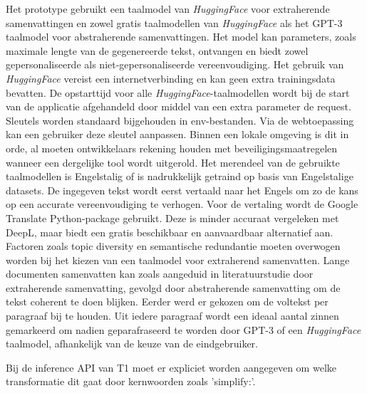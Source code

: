Het prototype gebruikt een taalmodel van \textit{HuggingFace} voor extraherende samenvattingen en zowel gratis taalmodellen van \textit{HuggingFace} als het GPT-3 taalmodel voor abstraherende samenvattingen. Het model kan parameters, zoals maximale lengte van de gegenereerde tekst, ontvangen en biedt zowel gepersonaliseerde als niet-gepersonaliseerde vereenvoudiging. Het gebruik van \textit{HuggingFace} vereist een internetverbinding en kan geen extra trainingsdata bevatten. De opstarttijd voor alle \textit{HuggingFace}-taalmodellen wordt bij de start van de applicatie afgehandeld door middel van een extra parameter de request. Sleutels worden standaard bijgehouden in env-bestanden. Via de webtoepassing kan een gebruiker deze sleutel aanpassen. Binnen een lokale omgeving is dit in orde, al moeten ontwikkelaars rekening houden met beveiligingsmaatregelen wanneer een dergelijke tool wordt uitgerold. Het merendeel van de gebruikte taalmodellen is Engelstalig of is nadrukkelijk getraind op basis van Engelstalige datasets. De ingegeven tekst wordt eerst vertaald naar het Engels om zo de kans op een accurate vereenvoudiging te verhogen. Voor de vertaling wordt de Google Translate Python-package gebruikt. Deze is minder accuraat vergeleken met DeepL, maar biedt een gratis beschikbaar en aanvaardbaar alternatief aan. Factoren zoals topic diversity en semantische redundantie moeten overwogen worden bij het kiezen van een taalmodel voor extraherend samenvatten. Lange documenten samenvatten kan zoals aangeduid in literatuurstudie door extraherende samenvatting, gevolgd door abstraherende samenvatting om de tekst coherent te doen blijken. Eerder werd er gekozen om de voltekst per paragraaf bij te houden. Uit iedere paragraaf wordt een ideaal aantal zinnen gemarkeerd om nadien geparafraseerd te worden door GPT-3 of een \textit{HuggingFace} taalmodel, afhankelijk van de keuze van de eindgebruiker.



Bij de inference API van T1 moet er expliciet worden aangegeven om welke transformatie dit gaat door kernwoorden zoals 'simplify:'.

\medspace

